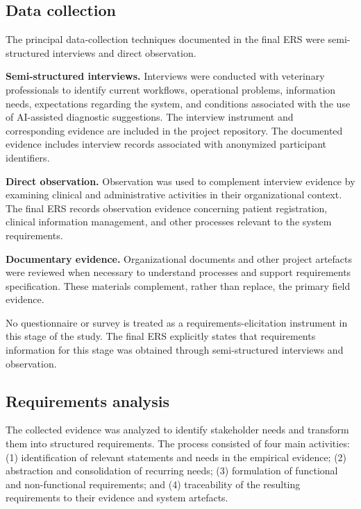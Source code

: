 \documentclass[pdflatex,sn-mathphys-num,Numbered]{sn-jnl}
\begin{document}
\subsection{Data collection}\label{subsec4}

The principal data-collection techniques documented in the final ERS were semi-structured interviews and direct observation.

\textbf{Semi-structured interviews.} Interviews were conducted with veterinary professionals to identify current workflows, operational problems, information needs, expectations regarding the system, and conditions associated with the use of AI-assisted diagnostic suggestions. The interview instrument and corresponding evidence are included in the project repository. The documented evidence includes interview records associated with anonymized participant identifiers.

\textbf{Direct observation.} Observation was used to complement interview evidence by examining clinical and administrative activities in their organizational context. The final ERS records observation evidence concerning patient registration, clinical information management, and other processes relevant to the system requirements.

\textbf{Documentary evidence.} Organizational documents and other project artefacts were reviewed when necessary to understand processes and support requirements specification. These materials complement, rather than replace, the primary field evidence.

No questionnaire or survey is treated as a requirements-elicitation instrument in this stage of the study. The final ERS explicitly states that requirements information for this stage was obtained through semi-structured interviews and observation.

\subsection{Requirements analysis}\label{subsec5}

The collected evidence was analyzed to identify stakeholder needs and transform them into structured requirements. The process consisted of four main activities: (1) identification of relevant statements and needs in the empirical evidence; (2) abstraction and consolidation of recurring needs; (3) formulation of functional and non-functional requirements; and (4) traceability of the resulting requirements to their evidence and system artefacts.
\end{document}
